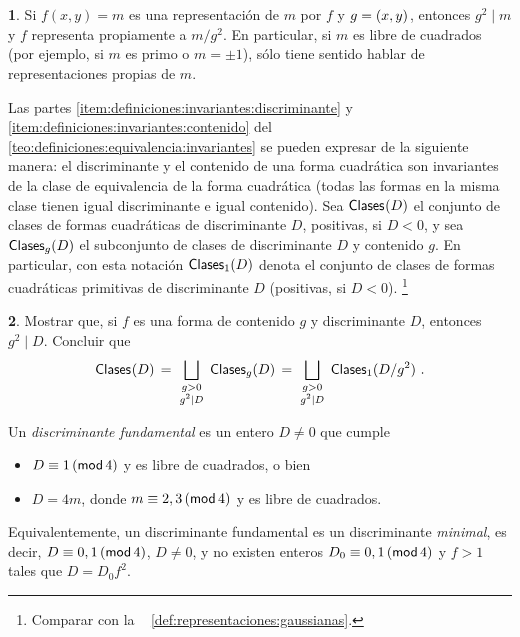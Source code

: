 \theoremstyle{definition}
\newtheorem{ejerDefiniciones}{\ejername}[section]


\begin{ejerDefiniciones}\label{ejer:definiciones:propiamente}
	Si $f(x,y)=m$ es una representaci\'on de $m$ por $f$ y
	$g=\mcd{x,y}$, entonces $g^2\mid m$ y $f$ representa
	propiamente a $m/g^2$.
	En particular, si $m$ es libre de cuadrados (por ejemplo,
	si $m$ es primo o $m=\pm 1$), s\'olo tiene sentido hablar
	de representaciones propias de $m$.
\end{ejerDefiniciones}

	Las partes \eqref{item:definiciones:invariantes:discriminante}
	y \eqref{item:definiciones:invariantes:contenido} del \teoname~%
	\ref{teo:definiciones:equivalencia:invariantes}
	se pueden expresar de la siguiente manera: el discriminante y
	el contenido de una forma cuadr\'atica son invariantes de la
	clase de equivalencia de la forma cuadr\'atica (todas las formas
	en la misma clase tienen igual discriminante e igual contenido).
	Sea $\varClases(D)$ el conjunto de clases de formas cuadr\'aticas
	de discriminante $D$, positivas, si $D<0$,
	y sea $\varClases[g](D)$ el subconjunto de
	clases de discriminante $D$ y contenido $g$.
	En particular, con esta notaci\'on $\varClases[1](D)$ denota el
	conjunto de clases de formas cuadr\'aticas primitivas de
	discriminante $D$ (positivas, si $D<0$).%
	\footnote{
		Comparar con la ~%
		\ref{def:representaciones:gaussianas}.
	}

\begin{ejerDefiniciones}\label{ejer:definiciones:clases}
	Mostrar que, si $f$ es una forma de contenido $g$ y discriminante
	$D$, entonces $g^2\mid D$. Concluir que
	\begin{displaymath}
		\varClases(D)\,=\,
		\bigsqcup_{\smatrix{g>0 \\ g^2\mid D}}\,\varClases[g](D)
			\,=\,\bigsqcup_{\smatrix{g>0 \\ g^2\mid D}}\,
				\varClases[1](D/g^2)
		\text{ .}
	\end{displaymath}
\end{ejerDefiniciones}

	Un \emph{discriminante fundamental} es un entero $D\neq 0$ que cumple
	\begin{itemize}
		\item $D\equiv 1\tmodulo[4]$ y es libre de cuadrados,
			o bien
		\item $D=4m$, donde $m\equiv 2,3\tmodulo[4]$ y es libre
			de cuadrados.
	\end{itemize}
	Equivalentemente, un discriminante fundamental es un discriminante
	\emph{minimal}, es decir,
	$D\equiv 0,1\tmodulo[4]$, $D\neq 0$, y no existen enteros
	$D_0\equiv 0,1\tmodulo[4]$ y $f>1$ tales que $D=D_0f^2$.

